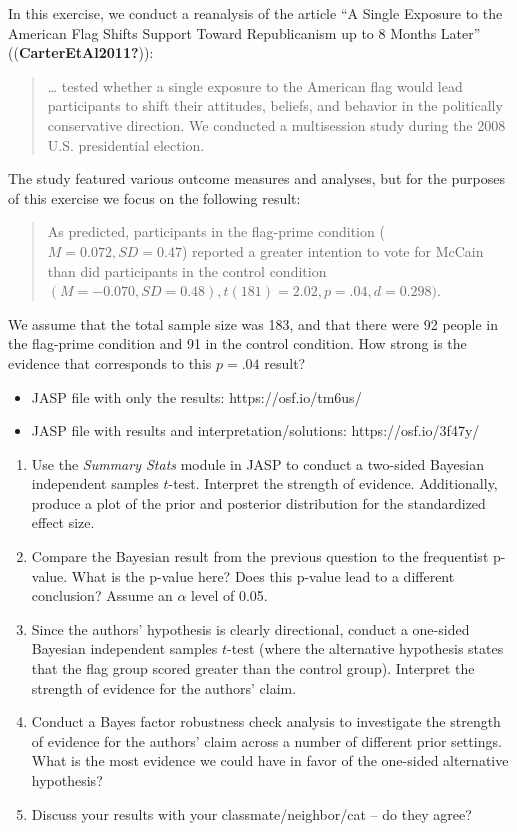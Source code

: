 \documentclass[
  letterpaper,
  DIV=11,
  numbers=noendperiod]{scrreprt}
\providecommand{\tightlist}{%
  \setlength{\itemsep}{0pt}\setlength{\parskip}{0pt}}\usepackage{longtable,booktabs,array}
\begin{document}
In this exercise, we conduct a reanalysis of the article ``A Single
Exposure to the American Flag Shifts Support Toward Republicanism up to
8 Months Later'' ((\textbf{CarterEtAl2011?})):

\begin{quote}
\ldots{} tested whether a single exposure to the American flag would
lead participants to shift their attitudes, beliefs, and behavior in the
politically conservative direction. We conducted a multisession study
during the 2008 U.S. presidential election.
\end{quote}

The study featured various outcome measures and analyses, but for the
purposes of this exercise we focus on the following result:

\begin{quote}
As predicted, participants in the flag-prime condition
(\(M = 0.072, SD = 0.47\)) reported a greater intention to vote for
McCain than did participants in the control condition
\((M = -0.070, SD = 0.48), t(181) = 2.02, p = .04, d = 0.298)\).
\end{quote}

We assume that the total sample size was 183, and that there were 92
people in the flag-prime condition and 91 in the control condition. How
strong is the evidence that corresponds to this \(p=.04\) result?

\begin{itemize}
\tightlist
\item
  JASP file with only the results: https://osf.io/tm6us/
\item
  JASP file with results and interpretation/solutions:
  https://osf.io/3f47y/
\end{itemize}

\begin{enumerate}
\def\labelenumi{\arabic{enumi}.}
\tightlist
\item
  Use the \emph{Summary Stats} module in JASP to conduct a two-sided
  Bayesian independent samples \(t\)-test. Interpret the strength of
  evidence. Additionally, produce a plot of the prior and posterior
  distribution for the standardized effect size.
\item
  Compare the Bayesian result from the previous question to the
  frequentist p-value. What is the p-value here? Does this p-value lead
  to a different conclusion? Assume an \(\alpha\) level of 0.05.
\item
  Since the authors' hypothesis is clearly directional, conduct a
  one-sided Bayesian independent samples \(t\)-test (where the
  alternative hypothesis states that the flag group scored greater than
  the control group). Interpret the strength of evidence for the
  authors' claim.
\item
  Conduct a Bayes factor robustness check analysis to investigate the
  strength of evidence for the authors' claim across a number of
  different prior settings. What is the most evidence we could have in
  favor of the one-sided alternative hypothesis?
\item
  Discuss your results with your classmate/neighbor/cat -- do they
  agree?
\end{enumerate}
\end{document}
